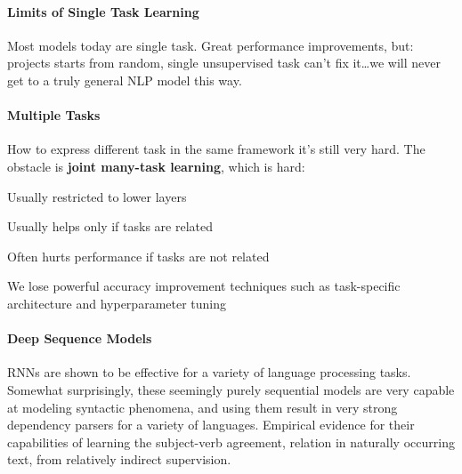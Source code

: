 \documentclass[10pt]{report}
\begin{document}
\paragraph{Limits of Single Task Learning} Most models today are single task. Great performance improvements, but: projects starts from random, single unsupervised task can't fix it\ldots we will never get to a truly general NLP model this way.
\paragraph{Multiple Tasks} How to express different task in the same framework it's still very hard. The obstacle is \textbf{joint many-task learning}, which is hard:
\begin{list}{}{}
	\item Usually restricted to lower layers
	\item Usually helps only if tasks are related
	\item Often hurts performance if tasks are not related
	\item We lose powerful accuracy improvement techniques such as task-specific architecture and hyperparameter tuning
\end{list}
\paragraph{Deep Sequence Models} RNNs are shown to be effective for a variety of language processing tasks. Somewhat surprisingly, these seemingly purely sequential models are very capable at modeling syntactic phenomena, and using them result in very strong dependency parsers for a variety of languages. Empirical evidence for their capabilities of learning the subject-verb agreement, relation in naturally occurring text, from relatively indirect supervision.
\end{document}
